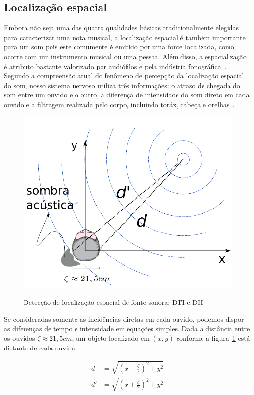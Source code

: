 \subsection{Localização espacial}
Embora não seja uma das quatro qualidades básicas tradicionalmente elegidas para caracterizar uma nota musical,
a localização espacial é também importante para um som
pois este comumente é emitido por uma fonte localizada, como ocorre com um instrumento musical ou uma pessoa. Além disso, a espacialização é atributo bastante valorizado
 por audiófilos e pela indústria fonográfica~\cite{floEsp}.
Segundo a compreensão atual do fenômeno de percepção da localização espacial do som, nosso sistema nervoso utiliza
três informações: o atraso de chegada do som entre um ouvido e o outro, a diferença de intensidade do som direto em cada ouvido e a 
filtragem realizada pelo corpo, incluindo toráx, cabeça e orelhas~\cite{Roederer, hrtf, Heeger}.


\begin{figure}[h!]
    \centering
    \caption{Detecção de localização espacial de fonte sonora: DTI e DII}
        \includegraphics[width=.5\textwidth]{figuras/espacializacao___}
        \label{fig:spac}
\end{figure}



	Se consideradas somente as incidências diretas em cada ouvido, podemos dispor as diferenças de tempo e intensidade em equações simples. Dada a distância entre os ouvidos $\zeta\approx 21,5cm$,
um objeto localizado em $(x,y)$ conforme a figura~\ref{fig:spac}
está distante de cada ouvido:

\begin{equation}
\begin{split}
d & =\sqrt{\left (x-\frac{\zeta}{2} \right )^2+y^2} \\
d' & =\sqrt{\left (x+\frac{\zeta}{2} \right )^2 + y^2}
\end{split}
\end{equation}


